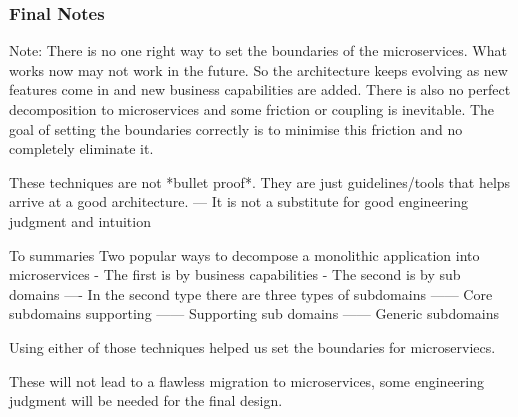 \documentclass[a4paper, 11pt]{book}
\begin{document}
    \subsubsection{Final Notes}
    Note: There is no one right way to set the boundaries of the microservices. What works now may not work in the future.
    So the architecture keeps evolving as new features come in and new business capabilities are added.
    There is also no perfect decomposition to microservices and some friction or coupling is inevitable.
    The goal of setting the boundaries correctly is to minimise this friction and no completely eliminate it.

    These techniques are not *bullet proof*. They are just guidelines/tools that helps arrive at a good architecture.
    --- It is not a substitute for good engineering judgment and intuition

    To summaries
    Two popular ways to decompose a monolithic application into microservices
    - The first is by business capabilities
    - The second is by sub domains
    ---- In the second type there are three types of subdomains
    ------ Core subdomains supporting
    ------ Supporting sub domains
    ------ Generic subdomains

    Using either of those techniques helped us set the boundaries for microserviecs.

    These will not lead to a flawless migration to microservices, some engineering judgment will be needed for the final design.
\end{document}
